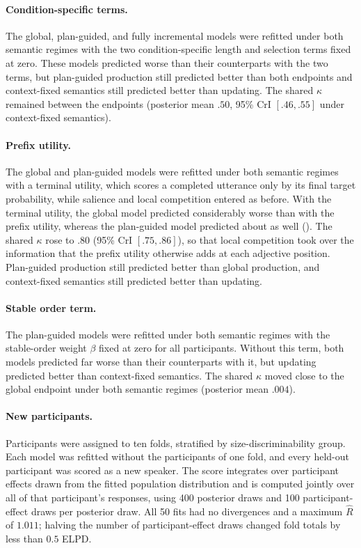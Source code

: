 \documentclass[10pt,a4paper,fleqn]{article}
\begin{document}
\paragraph{Condition-specific terms.}
The global, plan-guided, and fully incremental models were refitted under both semantic regimes with the two condition-specific length and selection terms fixed at zero.
These models predicted worse than their counterparts with the two terms, but plan-guided production still predicted better than both endpoints and context-fixed semantics still predicted better than updating.
The shared $\kappa$ remained between the endpoints (posterior mean $.50$, 95\% CrI $[.46,.55]$ under context-fixed semantics).

\paragraph{Prefix utility.}
The global and plan-guided models were refitted under both semantic regimes with a terminal utility, which scores a completed utterance only by its final target probability, while salience and local competition entered as before.
With the terminal utility, the global model predicted considerably worse than with the prefix utility, whereas the plan-guided model predicted about as well ().
The shared $\kappa$ rose to $.80$ (95\% CrI $[.75,.86]$), so that local competition took over the information that the prefix utility otherwise adds at each adjective position.
Plan-guided production still predicted better than global production, and context-fixed semantics still predicted better than updating.

\paragraph{Stable order term.}
The plan-guided models were refitted under both semantic regimes with the stable-order weight $\beta$ fixed at zero for all participants.
Without this term, both models predicted far worse than their counterparts with it, but updating predicted better than context-fixed semantics.
The shared $\kappa$ moved close to the global endpoint under both semantic regimes (posterior mean $.004$).

\paragraph{New participants.}
Participants were assigned to ten folds, stratified by size-discriminability group.
Each model was refitted without the participants of one fold, and every held-out participant was scored as a new speaker.
The score integrates over participant effects drawn from the fitted population distribution and is computed jointly over all of that participant's responses, using 400 posterior draws and 100 participant-effect draws per posterior draw.
All 50 fits had no divergences and a maximum $\widehat R$ of $1.011$; halving the number of participant-effect draws changed fold totals by less than $0.5$ ELPD.
\end{document}
